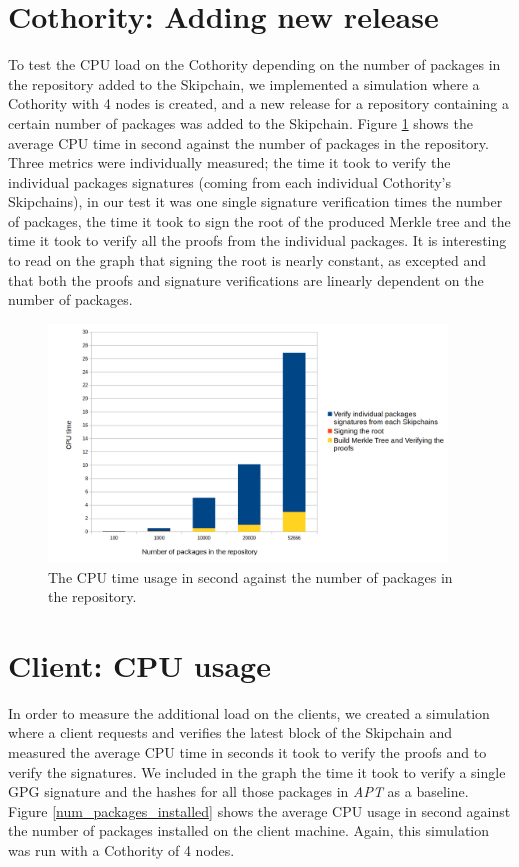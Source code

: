 \documentclass[11pt, upma4paper, twoside, openany, parskip=half]{book}
\begin{document}
\section{Cothority: Adding new release}
To test the CPU load on the Cothority depending on the number of packages in the repository added to the Skipchain, we implemented a simulation where a Cothority with 4 nodes is created, and a new release for a repository containing a certain number of packages was added to the Skipchain. Figure \ref{num_users} shows the average CPU time in second against the number of packages in the repository. Three metrics were individually measured; the time it took to verify the individual packages signatures (coming from each individual Cothority's Skipchains), in our test it was one single signature verification times the number of packages, the time it took to sign the root of the produced Merkle tree and the time it took to verify all the proofs from the individual packages. It is interesting to read on the graph that signing the root is nearly constant, as excepted and that both the proofs and signature verifications are linearly dependent on the number of packages.
\begin{figure}[H]
	\centering
	\includegraphics[width=300pt]{cothority_measures_lin.png}
	\caption{The CPU time usage in second against the number of packages in the repository.}
	\label{num_users}
\end{figure}

\section{Client: CPU usage}
In order to measure the additional load on the clients, we created a simulation where a client requests and verifies the latest block of the Skipchain and measured the average CPU time in seconds it took to verify the proofs and to verify the signatures. We included in the graph the time it took to verify a single GPG signature and the hashes for all those packages in \emph{APT} as a baseline. Figure \ref{num_packages_installed} shows the average CPU usage in second against the number of packages installed on the client machine. Again, this simulation was run with a Cothority of 4 nodes.
\end{document}
